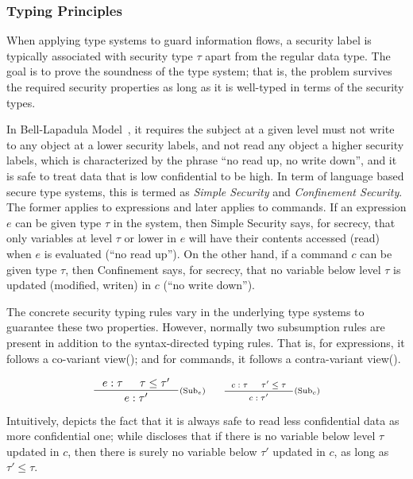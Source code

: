 \subsubsection{Typing Principles}

When applying type systems to guard information flows, a security label is typically associated with security type $\tau$ apart from the regular data type. The goal is to prove the soundness of the type system; that is, the problem survives the required security properties as long as it is well-typed in terms of the security types.

In Bell-Lapadula Model~\cite{bell1973}, it requires the subject at a given level must not write to any object at a lower security labels, and not read any object a higher security labels, which is characterized by the phrase ``no read up, no write down'', and it is safe to treat data that is low confidential to be high. In term of language based secure type systems, this is termed as \emph{Simple Security} and \emph{Confinement Security}. The former applies to expressions and later applies to commands. If an expression $e$ can be given type $\tau$ in the system, then Simple Security says, for secrecy, that only variables at level $\tau$ or lower in $e$ will have their contents accessed (read) when $e$ is evaluated (``no read up''). On the other hand, if a command $c$ can be given type $\tau$, then Confinement says, for secrecy, that no variable below level $\tau$ is updated (modified, writen) in $c$ (``no write down'').

The concrete security typing rules vary in the underlying type systems to guarantee these two properties. However, normally two subsumption rules are present in addition to the syntax-directed typing rules. That is, for expressions, it follows a co-variant view(); and for commands, it follows a contra-variant view().

\begin{equation*}
\inference
{e:\tau & \tau\leq\tau'}
{e:\tau'}
\ruleTagMath{Sub$_e$}
\qquad
\inference
{c:\tau & \tau'\leq\tau}
{c:\tau'}
\ruleTagMath{Sub$_c$}
\end{equation*}

Intuitively,  depicts the fact that it is always safe to read less confidential data as more confidential one; while  discloses that if there is no variable below level $\tau$ updated in $c$, then there is surely no variable below $\tau'$ updated in $c$, as long as $\tau'\leq\tau$.

